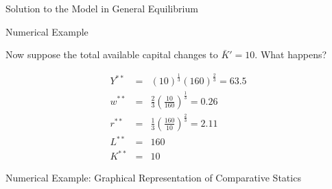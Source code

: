 \documentclass[notes,11pt, aspectratio=169, xcolor=table]{beamer}
\begin{document}
\begin{frame}{Solution to the Model in General Equilibrium}
\begin{figure}[htbp!]
\begin{subfigure}{}
{
}

\end{subfigure}

\end{figure}
\end{frame}


\begin{frame}{Numerical Example}

Now suppose the total available capital changes to $\bar{K}' = 10$. What happens?

  \begin{eqnarray*}
    Y^{**} &=&  (10)^{\frac{1}{3}}  (160)^{\frac{2}{3}} = 63.5 \\
    w^{**} &=& \frac{2}{3} \left( \frac{10}{160} \right)^{\frac{1}{3}} = 0.26 \\
     r^{**} &=&  \frac{1}{3} \left( \frac{160}{10} \right)^{\frac{2}{3}} = 2.11  \\
     L^{**} &=& 160  \\
     K^{**} &=& 10
  \end{eqnarray*}
\end{frame}

\begin{frame}{Numerical Example: Graphical Representation of Comparative Statics}


\end{frame}
\end{document}
